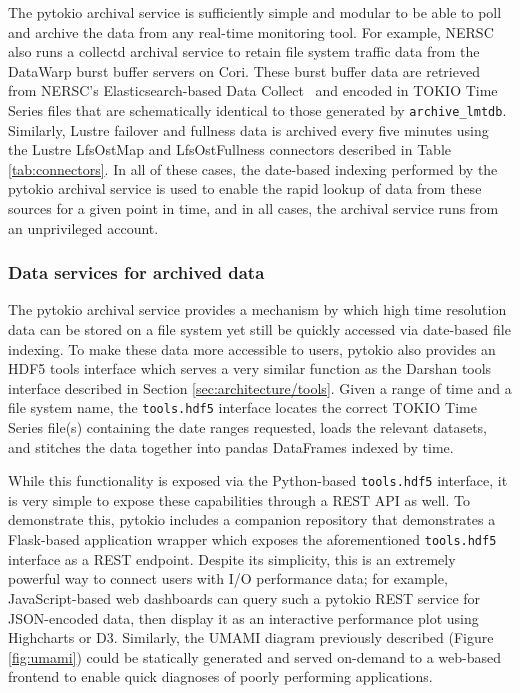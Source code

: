 The pytokio archival service is sufficiently simple and modular to be able to poll and archive the data from any real-time monitoring tool.
For example, NERSC also runs a collectd archival service to retain file system traffic data from the DataWarp burst buffer servers on Cori. 
These burst buffer data are retrieved from NERSC's Elasticsearch-based Data Collect~\cite{Whitney2016} and encoded in TOKIO Time Series files that are schematically identical to those generated by \texttt{archive\_lmtdb}.
Similarly, Lustre failover and fullness data is archived every five minutes using the Lustre LfsOstMap and LfsOstFullness connectors described in Table \ref{tab:connectors}.
In all of these cases, the date-based indexing performed by the pytokio archival service is used to enable the rapid lookup of data from these sources for a given point in time, and in all cases, the archival service runs from an unprivileged account.

\subsubsection{Data services for archived data}

The pytokio archival service provides a mechanism by which high time resolution data can be stored on a file system yet still be quickly accessed via date-based file indexing.
To make these data more accessible to users, pytokio also provides an HDF5 tools interface which serves a very similar function as the Darshan tools interface described in Section \ref{sec:architecture/tools}.
Given a range of time and a file system name, the \texttt{tools.hdf5} interface locates the correct TOKIO Time Series file(s) containing the date ranges requested, loads the relevant datasets, and stitches the data together into pandas DataFrames indexed by time.

While this functionality is exposed via the Python-based \texttt{tools.hdf5} interface, it is very simple to expose these capabilities through a REST API as well.
To demonstrate this, pytokio includes a companion repository that demonstrates a Flask-based application wrapper which exposes the aforementioned \texttt{tools.hdf5} interface as a REST endpoint.
Despite its simplicity, this is an extremely powerful way to connect users with I/O performance data;
for example, JavaScript-based web dashboards can query such a pytokio REST service for JSON-encoded data, then display it as an interactive performance plot using Highcharts or D3.
Similarly, the UMAMI diagram previously described (Figure \ref{fig:umami}) could be statically generated and served on-demand to a web-based frontend to enable quick diagnoses of poorly performing applications.
